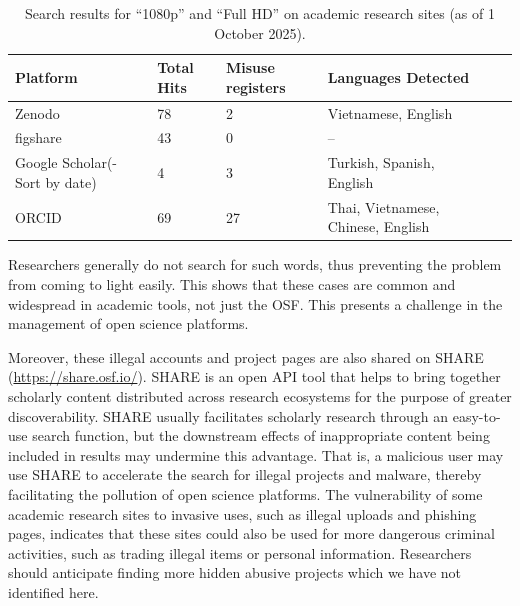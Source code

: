 \documentclass[authordate, meta, issue]{jote-new-article}
\begin{document}
	\begin{table}
		\begin{tabular}{@{} l l l l l l @{}}

			 \textbf{Platform} & \textbf{Total Hits} & \textbf{Misuse registers} &
			\textbf{Languages Detected} \\
\hline
			   Zenodo & 78 & 2 & Vietnamese, English \\

			   figshare & 43 & 0 & – \\

			   Google Scholar(- Sort by date) & 4 & 3 & Turkish, Spanish, English \\

			 ORCID & 69 & 27 & Thai, Vietnamese, Chinese, English \\
\hline
		\end{tabular}

		\caption{Search results for “1080p” and “Full HD” on academic research sites (as of 1 October 2025).}
	\end{table}









	Researchers generally do not search for such words, thus preventing the problem from coming to light easily. This shows that these cases are common and widespread in academic tools, not just the OSF. This presents a challenge in the management of open science platforms.



	Moreover, these illegal accounts and project pages are also shared on SHARE (\url{https://share.osf.io/}). SHARE is an open API tool that helps to bring together scholarly content distributed across research ecosystems for the purpose of greater discoverability. SHARE usually facilitates scholarly research through an easy-to-use search function, but the downstream effects of inappropriate content being included in results may undermine this advantage. That is, a malicious user may use SHARE to accelerate the search for illegal projects and malware, thereby facilitating the pollution of open science platforms. The vulnerability of some academic research sites to invasive uses, such as illegal uploads and phishing pages, indicates that these sites could also be used for more dangerous criminal activities, such as trading illegal items or personal information. Researchers should anticipate finding more hidden abusive projects which we have not identified here.
\end{document}
